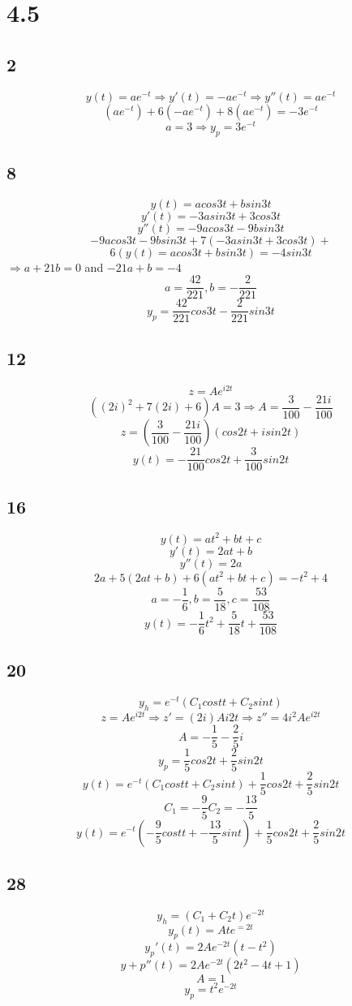 \documentclass[12pt, a4paper]{IEEEtran}
\begin{document}
    \section{4.5}
    \subsection{2}
    $$y(t)=ae^{-t}\Rightarrow y'(t)=-ae^{-t} \Rightarrow y''(t)=ae^{-t}$$
    $$(ae^{-t})+6(-ae^{-t})+8(ae^{-t})=-3e^{-t}$$
    $$a=3\Rightarrow y_{p}=3e^{-t}$$    

    \subsection{8}
    $$y(t)=acos3t+bsin3t$$
    $$y'(t)=-3asin3t+3cos3t$$
    $$y''(t)=-9acos3t-9bsin3t$$
    $$-9acos3t-9bsin3t+7(-3asin3t+3cos3t)+$$
    $$6(y(t)=acos3t+bsin3t)=-4sin3t$$
    $\Rightarrow a+21b=0$ and $-21a+b=-4$
    $$a=\frac{42}{221}, b=-\frac{2}{221}$$
    $$y_{p}=\frac{42}{221}cos3t-\frac{2}{221}sin3t$$

    \subsection{12}
    $$z=Ae^{i2t}$$
    $$((2i)^2+7(2i)+6)A=3\Rightarrow A=\frac{3}{100}-\frac{21i}{100}$$
    $$z=(\frac{3}{100}-\frac{21i}{100})(cos2t+isin2t)$$
    $$y(t)=-\frac{21}{100}cos2t+\frac{3}{100}sin2t$$

    \subsection{16}
    $$y(t)=at^2+bt+c$$
    $$y'(t)=2at+b$$
    $$y''(t)=2a$$
    $$2a+5(2at+b)+6(at^2+bt+c)=-t^2+4$$
    $$a=-\frac{1}{6},b=\frac{5}{18},c=\frac{53}{108}$$
    $$y(t)=-\frac{1}{6}t^2+\frac{5}{18}t+\frac{53}{108}$$

    \subsection{20}
    $$y_h=e^{-t}(C_1costt+C_2sint)$$
    $$z=Ae^{i2t}\Rightarrow z'=(2i)Ai2t \Rightarrow z''=4i^2Ae^{i2t}$$
    $$A=-\frac{1}{5}-\frac{2}{5}i$$
    $$y_p=\frac{1}{5}cos2t+\frac{2}{5}sin2t$$
    $$y(t)=e^{-t}(C_1costt+C_2sint)+\frac{1}{5}cos2t+\frac{2}{5}sin2t$$
    $$C_1=-\frac{9}{5} C_2=-\frac{13}{5}$$
    $$y(t)=e^{-t}(-\frac{9}{5}costt+-\frac{13}{5}sint)+\frac{1}{5}cos2t+\frac{2}{5}sin2t$$

    \subsection{28}
    $$y_h=(C_1+C_2t)e^{-2t}$$
    $$y_p(t)=Ate^{=2t}$$
    $$y_p'(t)=2Ae^{-2t}(t-t^2)$$
    $$y+p''(t)=2Ae^{-2t}(2t^2-4t+1)$$
    $$A=1$$
    $$y_p=t^2e^{-2t}$$
\end{document}
